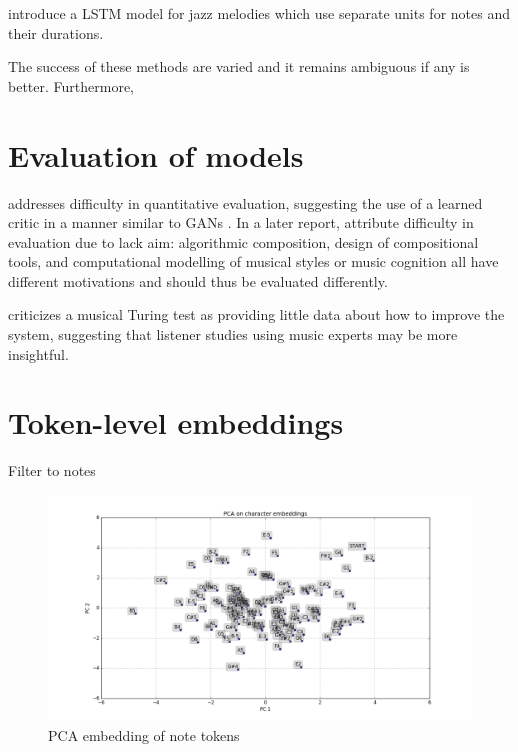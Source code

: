 \cite{franklin2005jazz} introduce a LSTM model for jazz melodies which use
separate units for notes and their durations.

The success of these methods are varied and it remains ambiguous if any
is better. Furthermore,

\section{Evaluation of models}

\cite{pearce2001towards} addresses difficulty in quantitative evaluation,
suggesting the use of a learned critic in a manner similar to GANs
\cite{goodfellow2014generative}. In a later report,
\cite{pearce2002motivations} attribute difficulty in evaluation due to lack
aim: algorithmic composition, design of compositional tools, and computational
modelling of musical styles or music cognition all have different motivations
and should thus be evaluated differently.

\cite{ariza2009interrogator} criticizes a musical Turing test as providing little data about
how to improve the system, suggesting that listener studies using music experts
may be more insightful.


\section{Token-level embeddings}


Filter to notes

\begin{figure}[tb]
    \centering
    \includegraphics[width=1.0\linewidth]{PCA-notes.png}
    \caption{PCA embedding of note tokens}
    \label{fig:pca-notes}
\end{figure}


